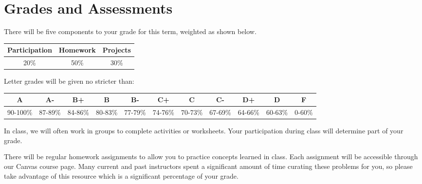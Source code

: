 \documentclass[11pt]{article}
\begin{document}
\section*{Grades and Assessments}
\vspace{-.5em}
\begin{description}[nosep]
    \item[Grade Breakdown] There will be five components to your grade for this term, weighted as shown below. \vspace{-.5em}
    \begin{center}
        \hspace{-3em}
        \begin{tabular}{|c|c|c|}
             \hline
              Participation & Homework & Projects \\ \hline
              20\%  &  50\% &  30\%  \\ 
              \hline
        \end{tabular}
    \end{center}
    
    
    \item[Letter Grades] Letter grades will be given no stricter than:\vspace{.125em} \\
        \begin{tabular}{|c|c|c|c|c|c|c|c|c|c|c|}
             \hline
              A & A- & B+ & B & B- & C+ & C & C- & D+ & D & F \\ \hline
              90-100\%  &  87-89\%  & 84-86\% & 80-83\% & 77-79\%  & 74-76\%  & 70-73\%  & 67-69\%  & 64-66\%  & 60-63\%  &  0-60\% \\ \hline
        \end{tabular}\vspace{.5em}
    
    \item[Participation] In class, we will often work in groups to complete activities or worksheets. Your participation during class will determine part of your grade.\vspace{.25em}
    
    
    \item[Homework] There will be regular homework assignments to allow you to practice concepts learned in class. Each assignment will be accessible through our Canvas course page.  Many current and past instructors spent a significant amount of time curating these problems for you, so please take advantage of this resource which is a significant percentage of your grade.\vspace{.25em}
    

\end{description}
\end{document}
